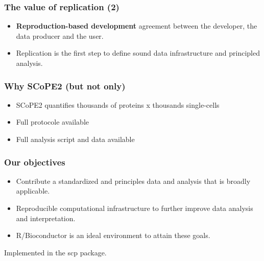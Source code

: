 \documentclass{beamer}
\newcommand{\hcode}[2][lgray]{{\ttfamily\color{vdgray}\colorbox{#1}{#2}}}
\newcommand{\frametitlesection}[1]{\frametitle{\centering #1 \footnotesize \hspace{0pt plus 1 filll} \insertsection}}
\begin{document}
\begin{frame}
  \frametitlesection{The value of replication (2)}

  \begin{itemize}
  \item \textbf{Reproduction-based development} agreement between the
    developer, the data producer and the user.
    
  \item Replication is the first step to define sound data
    infrastructure and principled analysis.
  \end{itemize}

\end{frame}

\begin{frame}
  \frametitlesection{Why SCoPE2 (but not only)}
    \begin{itemize}
        \item{SCoPE2 quantifies thousands of proteins x thousands single-cells}
        \item{Full protocole available}
        \item{Full analysis script and data available}
    \end{itemize}


\end{frame}

\begin{frame}
    \frametitlesection{Our objectives}
  
    \begin{itemize}
    \item Contribute a standardized and principles data and analysis
      that is broadly applicable.

    \item Reproducible computational infrastructure to further
      improve data analysis and interpretation.

    \item  R/Bioconductor is an ideal environment to attain these goals.
      
    \end{itemize}

    \bigskip
    
    Implemented in the \hcode{scp} package.

\end{frame}


\end{document}

